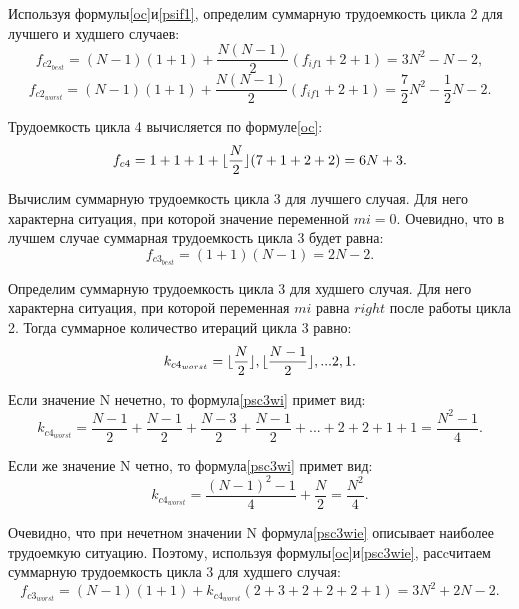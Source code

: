 Используя формулы\text{~}\eqref{oc}\text{~}и\text{~}\eqref{psif1}, определим суммарную трудоемкость цикла 2 для лучшего и худшего случаев:
\begin{equation}\label{psc2b}
	f_{c2_{best}} = (N - 1)(1 + 1) + \frac{N(N - 1)}{2}(f_{if1} + 2 + 1) = 3N^2 - N - 2,
\end{equation}
\begin{equation}\label{psc2w}
	f_{c2_{worst}} = (N - 1)(1 + 1) + \frac{N(N - 1)}{2}(f_{if1} + 2 + 1) = \frac{7}{2}N^2 - \frac{1}{2}N - 2.
\end{equation}

Трудоемкость цикла 4 вычисляется по формуле\text{~}\eqref{oc}:
\begin{equation}\label{psc4}
	f_{c4} = 1 + 1 + 1 + \lfloor \frac{N}{2} \rfloor(7 + 1 + 2 + 2) = 6N + 3.
\end{equation}

Вычислим суммарную трудоемкость цикла 3 для лучшего случая. Для него характерна ситуация, при которой значение переменной $mi = 0$. Очевидно, что в лучшем случае суммарная трудоемкость цикла 3 будет равна:
\begin{equation}\label{psc3b}
	f_{c3_{best}} = (1 + 1)(N - 1) = 2N - 2.
\end{equation}

Определим суммарную трудоемкость цикла 3 для худшего случая. Для него характерна ситуация, при которой переменная $mi$ равна $right$ после работы цикла 2. Тогда суммарное количество итераций цикла 3 равно:
\begin{equation}\label{psc3wi}
	k_{c4_{worst}} = \lfloor \frac{N}{2} \rfloor, \lfloor \frac{N - 1}{2} \rfloor, ... 2, 1.
\end{equation}

Если значение N нечетно, то формула\text{~}\eqref{psc3wi} примет вид:
\begin{equation}\label{psc3wio}
	k_{c4_{worst}} = \frac{N - 1}{2} + \frac{N - 1}{2} + \frac{N - 3}{2} + \frac{N - 1}{2} + ... + 2 + 2 + 1 + 1 = \frac{N^2 - 1}{4}.
\end{equation}

Если же значение N четно, то формула\text{~}\eqref{psc3wi} примет вид:
\begin{equation}\label{psc3wie}
	k_{c4_{worst}} = \frac{(N - 1)^2 - 1}{4} + \frac{N}{2} = \frac{N^2}{4}.
\end{equation}

Очевидно, что при нечетном значении N формула\text{~}\eqref{psc3wie} описывает наиболее трудоемкую ситуацию. Поэтому, используя формулы\text{~}\eqref{oc}\text{~}и\text{~}\eqref{psc3wie}, расcчитаем суммарную трудоемкость цикла 3 для худшего случая:
\begin{equation}\label{psc3w}
	f_{c3_{worst}} = (N - 1)(1 + 1) + k_{c4_{worst}}(2 + 3 + 2 + 2 + 2 + 1) = 3N^2 + 2N - 2.
\end{equation}

